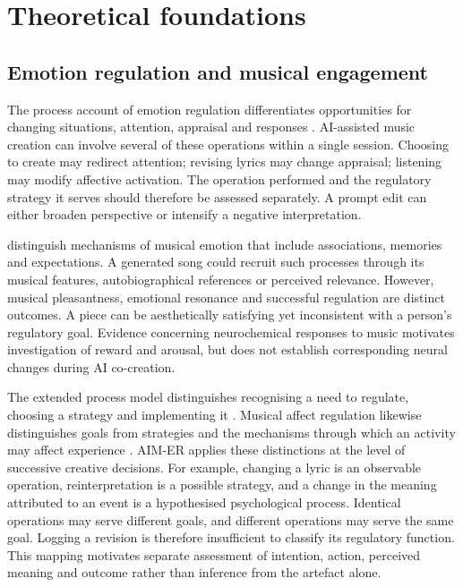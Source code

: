 \documentclass[11pt,a4paper]{article}
\begin{document}
\section{Theoretical foundations}
\subsection{Emotion regulation and musical engagement}
The process account of emotion regulation differentiates opportunities for changing situations, attention, appraisal and responses \citep{gross2015}. AI-assisted music creation can involve several of these operations within a single session. Choosing to create may redirect attention; revising lyrics may change appraisal; listening may modify affective activation. The operation performed and the regulatory strategy it serves should therefore be assessed separately. A prompt edit can either broaden perspective or intensify a negative interpretation.

\citet{juslin2008} distinguish mechanisms of musical emotion that include associations, memories and expectations. A generated song could recruit such processes through its musical features, autobiographical references or perceived relevance. However, musical pleasantness, emotional resonance and successful regulation are distinct outcomes. A piece can be aesthetically satisfying yet inconsistent with a person's regulatory goal. Evidence concerning neurochemical responses to music \citep{chanda2013} motivates investigation of reward and arousal, but does not establish corresponding neural changes during AI co-creation.

The extended process model distinguishes recognising a need to regulate, choosing a strategy and implementing it \citep{gross2015}. Musical affect regulation likewise distinguishes goals from strategies and the mechanisms through which an activity may affect experience \citep{baltazar2019}. AIM-ER applies these distinctions at the level of successive creative decisions. For example, changing a lyric is an observable operation, reinterpretation is a possible strategy, and a change in the meaning attributed to an event is a hypothesised psychological process. Identical operations may serve different goals, and different operations may serve the same goal. Logging a revision is therefore insufficient to classify its regulatory function. This mapping motivates separate assessment of intention, action, perceived meaning and outcome rather than inference from the artefact alone.
\end{document}
